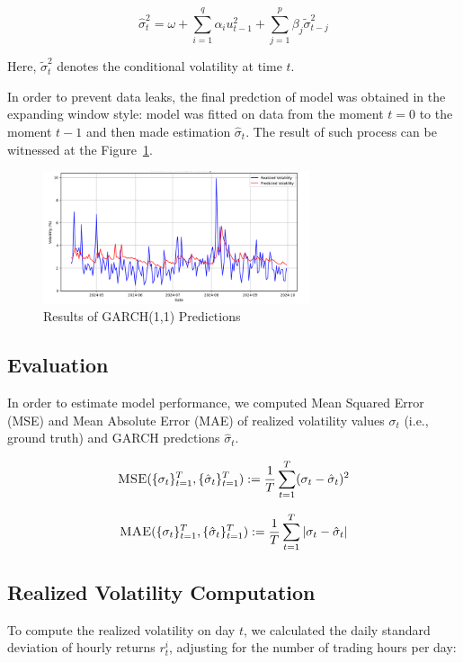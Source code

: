 \begin{equation}
    \hat{\sigma}_t^2 = \omega + \sum_{i=1}^{q} \alpha_i u_{t-1}^2 + \sum_{j=1}^{p} \beta_j \tilde{\sigma}_{t-j}^2
\end{equation}

Here, \(\tilde{\sigma}_t^2\) denotes the conditional volatility at time \(t\).

In order to prevent data leaks, the final predction of model was obtained in the expanding window style: model was fitted on data from the moment $t=0$ to the moment $t-1$ and then made estimation $\hat{\sigma}_t$. The result of such process can be witnessed at the Figure~\ref{fig:predictions}.

\begin{figure}[ht]
    \centering
    \includegraphics[width=0.7\textwidth]{img/realized_vs_pred.png}  %
    \caption{Results of GARCH(1,1) Predictions}
    \label{fig:predictions}
\end{figure}

\subsection{Evaluation}
In order to estimate model performance, we computed Mean Squared Error (MSE) and Mean Absolute Error (MAE) of realized volatility values $\sigma_t$ (i.e., ground truth) and GARCH predctions $\hat{\sigma}_t$.

\begin{equation}
    \textsc{MSE}(\{\sigma_t\}_{t=1}^T, \{\hat{\sigma}_t\}_{t=1}^T) := \frac{1}{T}\sum_{t=1}^T (\sigma_t - \hat{\sigma}_t)^2
\end{equation}

\begin{equation}
    \textsc{MAE}(\{\sigma_t\}_{t=1}^T, \{\hat{\sigma}_t\}_{t=1}^T) := \frac{1}{T}\sum_{t=1}^T |\sigma_t - \hat{\sigma}_t|
\end{equation}

\subsection{Realized Volatility Computation}
To compute the realized volatility on day \(t\), we calculated the daily standard deviation of hourly returns \(r_t^i\), adjusting for the number of trading hours per day:

